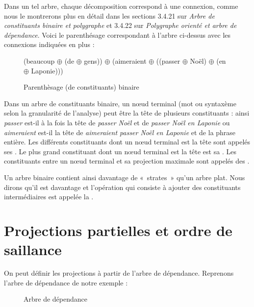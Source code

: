 Dans un tel arbre, chaque décomposition correspond à une connexion, comme nous le montrerons plus en détail dans les sections 3.4.21 sur \textit{Arbre de constituants binaire et polygraphe} et 3.4.22 sur \textit{Polygraphe orienté et arbre de dépendance}. Voici le parenthésage correspondant à l’arbre ci-dessus avec les connexions indiquées en plus :

\begin{figure}
(beaucoup ${\oplus}$ (de ${\oplus}$ gens)) ${\oplus}$ (aimeraient ${\oplus}$ ((passer ${\oplus}$ Noël) ${\oplus}$ (en ${\oplus}$ Laponie)))
\caption{\label{fig:}Parenthèsage (de constituants) binaire}

\end{figure}

Dans un arbre de constituants binaire, un nœud terminal (mot ou syntaxème selon la granularité de l’analyse) peut être la tête de plusieurs constituants : ainsi \textit{passer} est-il à la fois la tête de \textit{passer Noël} et de \textit{passer Noël en Laponie} ou \textit{aimeraient} est-il la tête de \textit{aimeraient passer Noël en Laponie} et de la phrase entière. Les différents constituants dont un nœud terminal est la tête sont appelés ses . Le plus grand constituant dont un nœud terminal est la tête est sa . Les constituants entre un nœud terminal et sa projection maximale sont appelés des .

\begin{styleLivreImportant}
Un arbre binaire contient ainsi davantage de «~strates~» qu’un arbre plat. Nous dirons qu’il est davantage  et l’opération qui consiste à ajouter des constituants intermédiaires est appelée la .
\end{styleLivreImportant}

\section{Projections partielles et ordre de saillance}\label{sec:3.4.15}

On peut définir les projections à partir de l’arbre de dépendance. Reprenons l’arbre de dépendance de notre exemple :

\begin{figure}

\caption{\label{fig:}Arbre de dépendance}

\end{figure}

